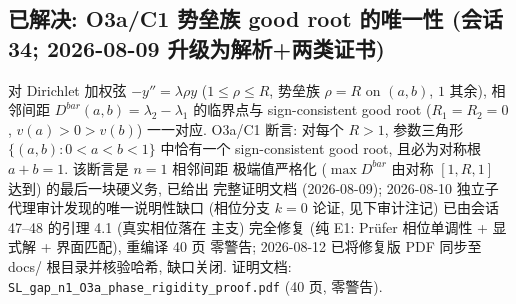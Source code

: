 \documentclass[UTF8]{ctexart}
\begin{document}
\subsection{\texorpdfstring{已解决: O3a/C1 势垒族 good root 的唯一性 (会话 34; 2026-08-09 升级为解析+两类证书)}{已解决: O3a/C1 势垒族 good root 的唯一性 (会话 34; 2026-08-09 升级为解析+两类证书)}}

对 Dirichlet 加权弦 $-y''=\lambda\rho y$ ($1\le\rho\le R$, 势垒族
$\rho=R$ on $(a,b)$, $1$ 其余), 相邻间距 $D^{bar}(a,b)=\lambda_2-\lambda_1$
的临界点与 sign-consistent good root ($R_1=R_2=0$, $v(a)>0>v(b)$) 一一对应.
O3a/C1 断言: 对每个 $R>1$, 参数三角形 $\{(a,b):0<a<b<1\}$ 中恰有一个
sign-consistent good root, 且必为对称根 $a+b=1$. 该断言是 $n=1$ 相邻间距
极端值严格化 ($\max D^{bar}$ 由对称 $[1,R,1]$ 达到) 的最后一块硬义务, 已给出
完整证明文档 (2026-08-09); 2026-08-10 独立子代理审计发现的唯一说明性缺口
(相位分支 $k=0$ 论证, 见下审计注记) 已由会话 47--48 的引理 4.1 (真实相位落在
主支) 完全修复 (纯 E1: Pr\"ufer 相位单调性 + 显式解 + 界面匹配), 重编译 40 页
零警告; 2026-08-12 已将修复版 PDF 同步至 docs/ 根目录并核验哈希, 缺口关闭.
证明文档: \texttt{SL\_gap\_n1\_O3a\_phase\_rigidity\_proof.pdf} (40 页, 零警告).
\end{document}
